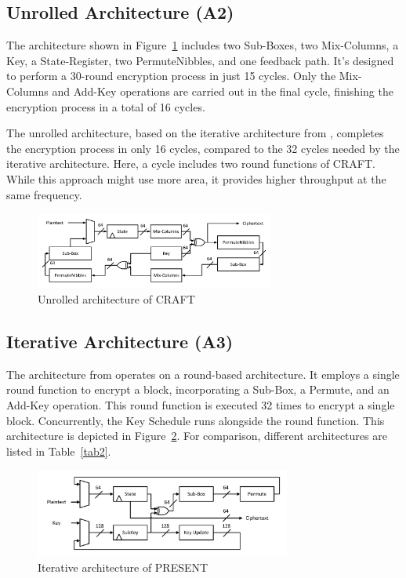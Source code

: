 \documentclass[final,5p,times,twocolumn]{elsarticle}
\begin{document}
\subsection{Unrolled Architecture (A2)}\label{subsec3}

The architecture shown in Figure~\ref{fig4} includes two Sub-Boxes, two Mix-Columns, a Key, a State-Register, two PermuteNibbles, and one feedback path. It's designed to perform a 30-round encryption process in just 15 cycles. Only the Mix-Columns and Add-Key operations are carried out in the final cycle, finishing the encryption process in a total of 16 cycles.

The unrolled architecture, based on the iterative architecture from \cite{beierle2019craft}, completes the encryption process in only 16 cycles, compared to the 32 cycles needed by the iterative architecture. Here, a cycle includes two round functions of CRAFT. While this approach might use more area, it provides higher throughput at the same frequency.


\begin{figure}[h]%
    \centering
    \includegraphics[width=0.7\textwidth]{./fig/unrolled-archticture.pdf}
    \caption{Unrolled architecture of CRAFT}\label{fig4}
\end{figure}

\subsection{Iterative Architecture (A3)}\label{iterative_architecture}

The architecture from \cite{bharathi2022light} operates on a round-based architecture.
It employs a single round function to encrypt a block, incorporating a Sub-Box, a Permute, and an Add-Key operation.
This round function is executed 32 times to encrypt a single block. Concurrently, the Key Schedule runs alongside the round function.
This architecture is depicted in Figure~\ref{fig5}.
For comparison, different architectures are listed in Table~\ref{tab2}.

\begin{figure}
    \centering
    \includegraphics[width=0.75\textwidth]{./fig/iteration-present.pdf}
    \caption{Iterative architecture of PRESENT}\label{fig5}
\end{figure}
\end{document}

